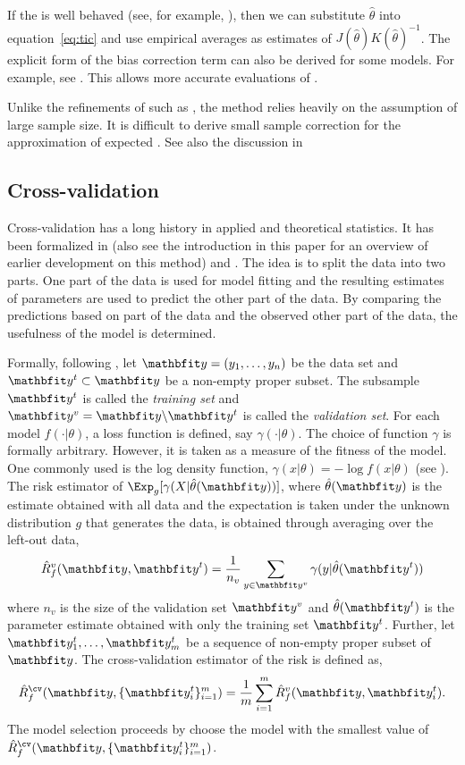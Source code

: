 If the \mle is well behaved (see, for example, \cite{Lehmann:1983vx}), then we
can substitute \mle $\hat\theta$ into equation~\ref{eq:tic} and use empirical
averages as estimates of $J(\hat\theta)K(\hat\theta)^{-1}$. The explicit form
of the bias correction term can also be derived for some models. For example,
see \cite[][sec.~6.6]{Burnham:2002wc}. This allows more accurate evaluations
of \tic.

Unlike the refinements of \aic such as \aicc, the \tic method relies heavily
on the assumption of large sample size. It is difficult to derive small sample
correction for the \tic approximation of expected \kld. See also the
discussion in \cite[][sec.~6.7.8]{Burnham:2002wc}

\subsection{Cross-validation}
\label{sub:Cross-validation}

Cross-validation has a long history in applied and theoretical statistics. It
has been formalized in \cite{Stone:1974vx} (also see the introduction in this
paper for an overview of earlier development on this method) and
\cite{Geisser:1975vx}. The idea is to split the data into two parts. One part
of the data is used for model fitting and the resulting estimates of
parameters are used to predict the other part of the data. By comparing the
predictions based on part of the data and the observed other part of the data,
the usefulness of the model is determined.

Formally, following \cite{Geisser:1975vx}, let $\data = (y_1,\dots,y_n)$ be
the data set and $\data^t\subset\data$ be a non-empty proper subset. The
subsample $\data^t$ is called the \emph{training set} and $\data^v =
\data\backslash\data^t$ is called the \emph{validation set}. For each model
$f(\cdot|\theta)$, a loss function is defined, say $\gamma(\cdot|\theta)$. The
choice of function $\gamma$ is formally arbitrary. However, it is taken as a
measure of the fitness of the model. One commonly used is the log density
function, $\gamma(x|\theta) = -\log f(x|\theta)$ (see \cite{Stone:1977vx}).
The risk estimator of $\Exp_g[\gamma(X|\hat\theta(\data))]$, where
$\hat\theta(\data)$ is the estimate obtained with all data and the expectation
is taken under the unknown distribution $g$ that generates the data, is
obtained through averaging over the left-out data,
\begin{equation}
  \hat{R}_f^v(\data,\data^t) =
  \frac{1}{n_v}\sum_{y\in\data^v}\gamma(y|\hat\theta(\data^t))
\end{equation}
where $n_v$ is the size of the validation set $\data^v$ and
$\hat\theta(\data^t)$ is the parameter estimate obtained with only the
training set $\data^t$.  Further, let $\data_1^t,\dots,\data_m^t$ be a
sequence of non-empty proper subset of $\data$. The cross-validation estimator
of the risk is defined as,
\begin{equation}
  \hat{R}_f^{\cv}(\data,\{\data_i^t\}_{i=1}^m) =
  \frac{1}{m}\sum_{i=1}^m \hat{R}_f^v(\data,\data_i^t).
\end{equation}
The model selection proceeds by choose the model with the smallest value of
$\hat{R}_f^{\cv}(\data,\{\data_i^t\}_{i=1}^m)$.

